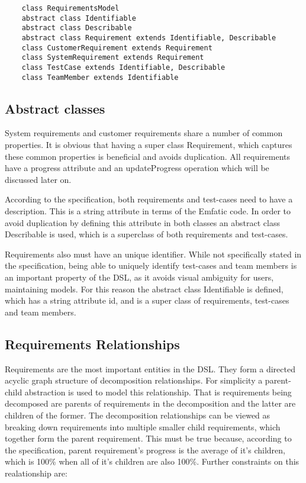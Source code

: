 \documentclass[11pt,a4paper]{scrartcl}
\begin{document}
	\begin{lstlisting}
	class RequirementsModel
	abstract class Identifiable
	abstract class Describable
	abstract class Requirement extends Identifiable, Describable
	class CustomerRequirement extends Requirement
	class SystemRequirement extends Requirement
	class TestCase extends Identifiable, Describable
	class TeamMember extends Identifiable
	\end{lstlisting}
	
	\subsection{Abstract classes}
	System requirements and customer requirements share a number of common properties. It is obvious that having a super class Requirement, which captures these common properties is beneficial and avoids duplication. All requirements have a progress attribute and an updateProgress operation which will be discussed later on.
	
	According to the specification, both requirements and test-cases need to have a description. This is a string attribute in terms of the Emfatic code. In order to avoid duplication by defining this attribute in both classes an abstract class Describable is used, which is a superclass of both requirements and test-cases.
	
	Requirements also must have an unique identifier. While not specifically stated in the specification, being able to uniquely identify test-cases and team members is an important property of the DSL, as it avoids visual ambiguity for users, maintaining models. For this reason the abstract class Identifiable is defined, which has a string attribute id, and is a super class of requirements, test-cases and team members.
	
	\subsection{Requirements Relationships}
	Requirements are the most important entities in the DSL. They form a directed acyclic graph structure of decomposition relationships. For simplicity a parent-child abstraction is used to model this relationship. That is requirements being decomposed are parents of requirements in the decomposition and the latter are children of the former. The decomposition relationships can be viewed as breaking down requirements into multiple smaller child requirements, which together form the parent requirement. This must be true because, according to the specification, parent requirement's progress is the average of it's children, which is 100\% when all of it's children are also 100\%. Further constraints on this realationship are:
	
\end{document}
